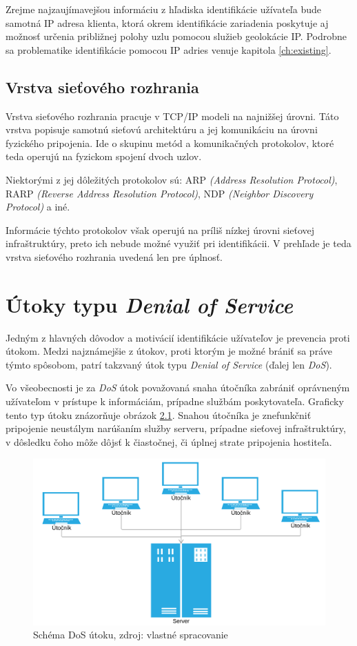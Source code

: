 \documentclass[
  digital, %
  table,   %
  lof,     %
  nolot,   %
  nocover
]{fithesis3}
\begin{document}
Zrejme najzaujímavejšou informáciu z hľadiska identifikácie užívateľa bude samotná IP
adresa klienta, ktorá okrem identifikácie zariadenia poskytuje aj možnosť určenia
približnej polohy uzlu pomocou služieb geolokácie IP. Podrobne sa problematike
identifikácie pomocou IP adries venuje kapitola \ref{ch:existing}. 

\section{Vrstva sieťového rozhrania}
Vrstva sieťového rozhrania pracuje v TCP/IP modeli na najnižšej úrovni.
Táto vrstva popisuje samotnú sieťovú architektúru a jej komunikáciu na úrovni
fyzického pripojenia. Ide o skupinu metód a komunikačných protokolov, ktoré 
teda operujú na fyzickom spojení dvoch uzlov.

Niektorými z jej dôležitých protokolov sú: ARP
\textit{(Address Resolution Protocol)}, RARP
\textit{(Reverse Address Resolution Protocol)},
NDP \textit{(Neighbor Discovery Protocol)} a iné.

Informácie týchto protokolov však operujú na príliš nízkej úrovni sieťovej
infraštruktúry, preto ich nebude možné využiť pri identifikácii. V prehľade je 
teda vrstva sieťového rozhrania uvedená len pre úplnosť.

\chapter{Útoky typu \textit{Denial of Service}}
\label{ch:dos}
Jedným z hlavných dôvodov a motivácií identifikácie užívateľov je prevencia
proti útokom. Medzi najznámejšie z útokov, proti ktorým je možné brániť sa
práve týmto spôsobom, patrí takzvaný útok typu \textit{Denial of Service}
(ďalej len \textit{DoS}).

Vo všeobecnosti je za \textit{DoS} útok považovaná snaha útočníka zabrániť
oprávneným užívateľom v prístupe k informáciám, prípadne službám poskytovateľa.
Graficky tento typ útoku znázorňuje obrázok \ref{fig:dos}.
Snahou útočníka je znefunkčniť pripojenie neustálym narúšaním služby serveru,
prípadne sieťovej infraštruktúry, v dôsledku čoho môže dôjsť k čiastočnej, či
úplnej strate pripojenia hostiteľa. 

\begin{figure}[h]
  \centering
    \includegraphics[width=\textwidth]{images/dos.png}
  \caption{Schéma DoS útoku, zdroj: vlastné spracovanie}
  \label{fig:dos}
\end{figure}
\end{document}
